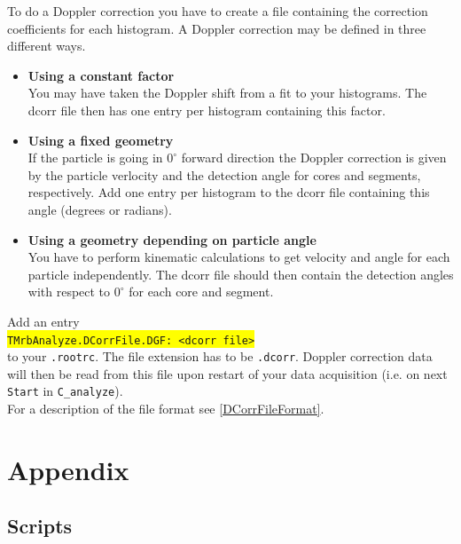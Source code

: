 \documentclass[10pt]{article}
\newcommand{\yellow}[1]{\colorbox{yellow}{\texttt{#1}}}
\begin{document}
To do a Doppler correction you have to create a file containing the correction coefficients for each
histogram. A Doppler correction may be defined in three different ways.
\begin{center}
\begin{itemize}
\setlength{\rightmargin}{1em}%
\setlength{\leftmargin}{2em}%
\setlength{\itemsep}{0pt}%
\setlength{\parskip}{1mm}%
\setlength{\partopsep}{0pt}%
\setlength{\parsep}{0pt}%
\setlength{\topsep}{0pt}%
\item	\textbf{Using a constant factor}\\
	You may have taken the Doppler shift from a fit to your histograms. The dcorr file then has one entry per histogram
	containing this factor.
\item	\textbf{Using a fixed geometry}\\
	If the particle is going in $0^\circ$ forward direction the Doppler correction is given by the particle
	verlocity and the detection angle for cores and segments, respectively.
	Add one entry per histogram to the dcorr file containing this
	angle (degrees or radians).
\item	\textbf{Using a geometry depending on particle angle}\\
	You have to perform kinematic calculations to get velocity and angle for each particle
	independently. The dcorr file should then contain the detection angles with respect to $0^\circ$ for each core and segment.
\end{itemize}
\end{center}

Add an entry\\
	\hspace*{3cm}\yellow{TMrbAnalyze.DCorrFile.DGF:	<dcorr file>}\\
	
to your \texttt{.rootrc}. The file extension has to be \texttt{.dcorr}.
Doppler correction data will then be read from this file upon restart of your data acquisition
(i.e. on next \texttt{Start} in \texttt{C\_analyze}).\\

For a description of the file format see \ref{DCorrFileFormat}.
\newpage
\section{Appendix}\vspace{3mm}
\subsection{Scripts}\vspace{3mm}
\end{document}
